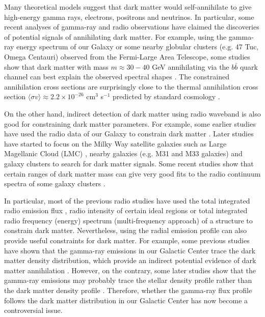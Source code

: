 \documentclass[useAMS,usenatbib]{mn2e}
\begin{document}
Many theoretical models suggest that dark matter would self-annihilate to give high-energy gamma rays, electrons, positrons and neutrinos. In particular, some recent analyses of gamma-ray and radio observations have claimed the discoveries of potential signals of annihilating dark matter. For example, using the gamma-ray energy spectrum of our Galaxy or some nearby globular clusters (e.g. 47 Tuc, Omega Centauri) observed from the Fermi-Large Area Telescope, some studies show that dark matter with mass $m \approx 30-40$ GeV annihilating via the $b \bar{b}$ quark channel can best explain the observed spectral shapes \citep{Daylan,Calore,Abazajian,Cholis,Brown,Brown2}. The constrained annihilation cross sections are surprisingly close to the thermal annihilation cross section $\langle \sigma v \rangle \approx 2.2 \times 10^{-26}$ cm$^3$ s$^{-1}$ predicted by standard cosmology \citep{Steigman}. 

On the other hand, indirect detection of dark matter using radio waveband is also good for constraining dark matter parameters. For example, some earlier studies have used the radio data of our Galaxy to constrain dark matter \citep{Blasi,Aloisio,Borriello}. Later studies have started to focus on the Milky Way satellite galaxies such as Large Magellanic Cloud (LMC) \citep{Tasitsiomi,Baltz,Siffert}, nearby galaxies (e.g. M31 and M33 galaxies) \citep{Borriello2,Egorov,Chan} and galaxy clusters \citep{Colafrancesco,Chan2,Chan3,Chan4} to search for dark matter signals. Some recent studies show that certain ranges of dark matter mass can give very good fits to the radio continuum spectra of some galaxy clusters \citep{Chan3,Chan4}.

In particular, most of the previous radio studies have used the total integrated radio emission flux \citep{Blasi,Aloisio}, radio intensity of certain ideal regions \citep{Borriello2,Siffert} or total integrated radio frequency (energy) spectrum (multi-frequency approach) \citep{Tasitsiomi,Borriello,Chan} of a structure to constrain dark matter. Nevertheless, using the radial emission profile can also provide useful constraints for dark matter. For example, some previous studies have shown that the gamma-ray emissions in our Galactic Center trace the dark matter density distribution, which provide an indirect potential evidence of dark matter annihilation \citep{Daylan,Calore}. However, on the contrary, some later studies show that the gamma-ray emissions may probably trace the stellar density profile rather than the dark matter density profile \citep{Bartels}. Therefore, whether the gamma-ray flux profile follows the dark matter distribution in our Galactic Center has now become a controversial issue.
\end{document}
